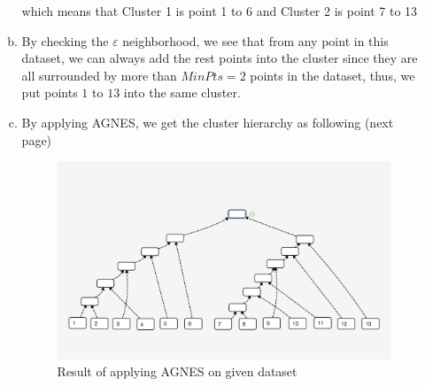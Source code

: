 \documentclass[11pt]{article}
\begin{document}
\begin{enumerate}
\begin{enumerate}[a.]
	which means that Cluster 1 is  point 1 to 6 and Cluster 2 is point 7 to 13
	\item By checking the $\varepsilon$ neighborhood, we see that from any point in this dataset, we can always add the rest points into the cluster since they are all surrounded by more than $MinPts = 2$ points in the dataset, thus, we put points $1$ to $13$ into the same cluster.
	\item 
	By applying AGNES, we get the cluster hierarchy as following (next page)
		\begin{figure}[H]
			\includegraphics[width=\textwidth]{hierarchy}
			\caption{Result of applying AGNES on given dataset}
		\end{figure}
		\end{enumerate}
	\end{enumerate}
\end{document}
